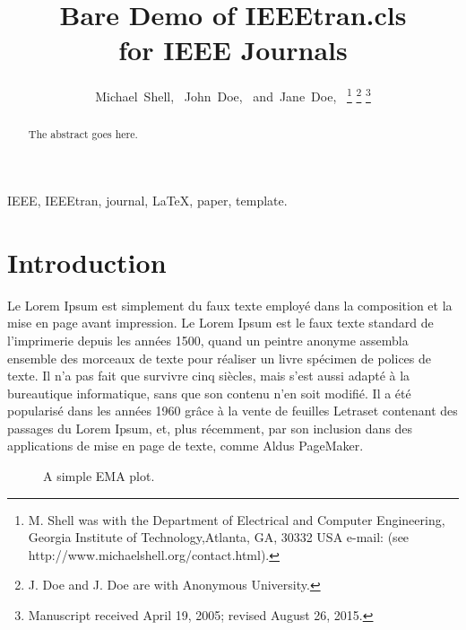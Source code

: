 \documentclass[journal]{IEEEtran}
\begin{document}
\title{Bare Demo of IEEEtran.cls\\ for IEEE Journals}

\author{Michael~Shell,~
        John~Doe,~
        and~Jane~Doe,~%
\thanks{M. Shell was with the Department
of Electrical and Computer Engineering, Georgia Institute of Technology,Atlanta,
GA, 30332 USA e-mail: (see http://www.michaelshell.org/contact.html).}%
\thanks{J. Doe and J. Doe are with Anonymous University.}%
\thanks{Manuscript received April 19, 2005; revised August 26, 2015.}}


\maketitle

\begin{abstract}
The abstract goes here.
\end{abstract}

\begin{IEEEkeywords}
IEEE, IEEEtran, journal, \LaTeX, paper, template.
\end{IEEEkeywords}

\section{Introduction}
Le Lorem Ipsum est simplement du faux texte employé dans la composition et la mise en page avant impression. Le Lorem Ipsum est le faux texte standard de l'imprimerie depuis les années 1500, quand un peintre anonyme assembla ensemble des morceaux de texte pour réaliser un livre spécimen de polices de texte. Il n'a pas fait que survivre cinq siècles, mais s'est aussi adapté à la bureautique informatique, sans que son contenu n'en soit modifié. Il a été popularisé dans les années 1960 grâce à la vente de feuilles Letraset contenant des passages du Lorem Ipsum, et, plus récemment, par son inclusion dans des applications de mise en page de texte, comme Aldus PageMaker.

\begin{figure}[htbp]
    \centering
    
    \caption{A simple EMA plot.\label{fig:ema1} \the\textwidth}
\end{figure}
\end{document}
